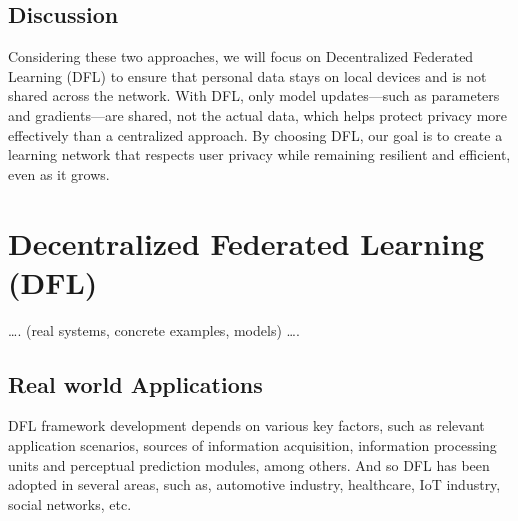\subsection{Discussion}
\label{sub:discussion}

Considering these two approaches, we will focus on Decentralized Federated Learning (DFL) to ensure that personal data stays on local devices and is not shared across the network. With DFL, only model updates—such as parameters and gradients—are shared, not the actual data, which helps protect privacy more effectively than a centralized approach.
By choosing DFL, our goal is to create a learning network that respects user privacy while remaining resilient and efficient, even as it grows.

\section{Decentralized Federated Learning (DFL)}
\label{sub:decentralized_federated_learning}

…. (real systems, concrete examples, models) ….


\subsection{Real world Applications}
\label{sub:real_worl_applications}

DFL framework development depends on various key factors, such as relevant application scenarios, sources of information acquisition, information processing units and perceptual prediction modules, among others. And so DFL has been adopted in several areas, such as, automotive industry, healthcare, IoT industry, social networks, etc.

